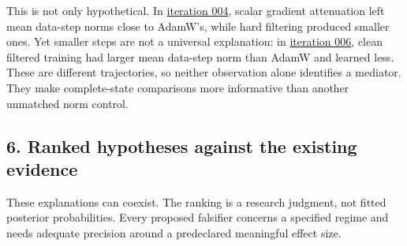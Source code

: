 \documentclass[
  british,
  10pt,
  a4paper,
]{article}
\begin{document}
This is not only hypothetical\allowbreak{}.\allowbreak{} In
\href{../continuation/iteration-004/summary.json}{iteration 004}, scalar
gradient attenuation left mean data-step norms close to AdamW's, while
hard filtering produced smaller ones. Yet smaller steps are not a
universal explanation: in
\href{../continuation/iteration-006/results.md}{iteration 006}, clean
filtered training had larger mean data-step norm than AdamW and learned
less. These are different trajectories\allowbreak{},\allowbreak{} so
neither observation alone identifies a mediator. They make
complete-\allowbreak{}state comparisons more informative than another
unmatched norm control.

\subsection{6. Ranked hypotheses against the existing
evidence}\label{mathematics--ranked-hypotheses-against-the-existing-evidence}

These explanations can coexist. The ranking is a research judgment, not
fitted posterior probabilitie\allowbreak{}s.\allowbreak{} Every proposed
falsifier concerns a specified regime and needs adequate precision
around a predeclared meaningful effect size.
\end{document}
